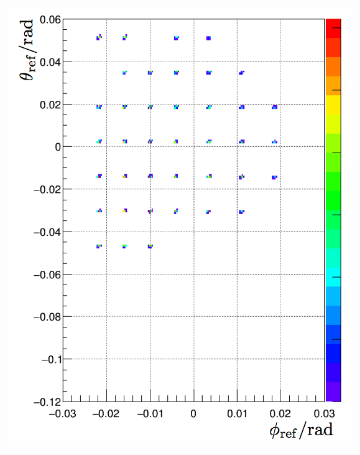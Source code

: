 \begin{figure}[tb!]
  \centering
  \begin{subfigure}[t]{0.45\textwidth}
    \includegraphics[width=\textwidth]{figs/reference-angle-simulation.png}
  \end{subfigure}
  \begin{subfigure}[t]{0.45\textwidth}

\end{subfigure}
\end{figure}
